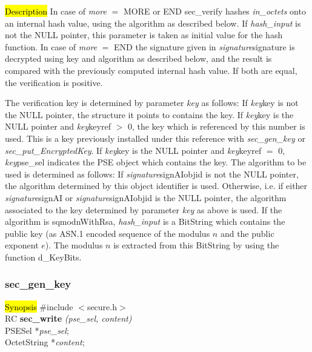
\hl{Description}
In case of {\em more} $=$ MORE or END sec\_verify hashes {\em in\_octets} onto
an internal hash value, using the algorithm as described below.
If {\em hash\_input} is not the NULL pointer, this parameter is taken
as initial value for the hash function.
In case of {\em more} $=$ END the signature given in {\em signature}\pf signature
is decrypted using key and algorithm as described below, and the result is compared
with the previously computed internal hash value. If both are equal, the verification
is positive. 

The verification key is determined by parameter {\em key} as follows:
\be
\m If {\em key}\pf key is not the NULL pointer, the structure it points to
   contains the key.
\m If {\em key}\pf key is the NULL pointer and {\em key}\pf keyref $>$ 0,
   the key which is referenced by this number is used. This is a key
   previously installed under this reference with {\em sec\_gen\_key} or 
   {\em sec\_put\_EncryptedKey}.
\m If {\em key}\pf key is the NULL pointer and {\em key}\pf keyref $=$ 0,
   {\em key}\pf pse\_sel indicates the PSE object which contains the key.
\ee
The algorithm to be used is determined as follows:
\be
\m If {\em signature}\pf signAI\pf objid is not the NULL pointer, the algorithm
   determined by this object identifier is used.
\m Otherwise, i.e. if either {\em signature}\pf signAI or {\em signature}\pf signAI\pf objid 
   is the NULL pointer, the algorithm
   associated to the key determined by parameter {\em key} as above is used.
\ee
If the algorithm is sqmodnWithRsa, {\em hash\_input} is a BitString which contains the 
public key (as ASN.1 encoded sequence of the modulus $n$ and the public
exponent $e$). The modulus $n$ is extracted from this BitString by using the function
d\_KeyBits.

\subsubsection{sec\_gen\_key}
\label{sec_write}
\hl{Synopsis}
\#include $<$secure.h$>$ \\ [0.5cm]
RC {\bf sec\_write} {\em (pse\_sel, content)} \\
PSESel *{\em pse\_sel}; \\
OctetString *{\em content}; 

